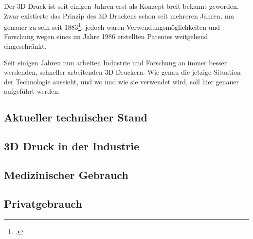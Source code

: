
Der 3D Druck ist seit einigen Jahren erst als Konzept breit bekannt geworden.
Zwar existierte das Prinzip des 3D Druckens schon seit mehreren Jahren, um genauer zu sein seit 1883\footcite{CHUCK}, jedoch waren Verwendungsmöglichkeiten und Forschung wegen eines im Jahre 1986 erstellten Patentes weitgehend eingeschränkt.

Seit einigen Jahren nun arbeiten Industrie und Forschung an immer besser werdenden, schneller arbeitenden 3D Druckern. Wie genau die jetzige Situation der Technologie aussieht, und wo und wie sie verwendet wird, soll hier genauer aufgeführt werden.

\subsection{Aktueller technischer Stand}
\subsection{3D Druck in der Industrie}
\subsection{Medizinischer Gebrauch}
\subsection{Privatgebrauch}